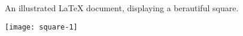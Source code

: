 \documentclass{article}
\begin{document}
An illustrated {\LaTeX} document, displaying a berautiful square.
\begin{center}
\texttt{[image: square-1]}
\end{center}
\end{document}
